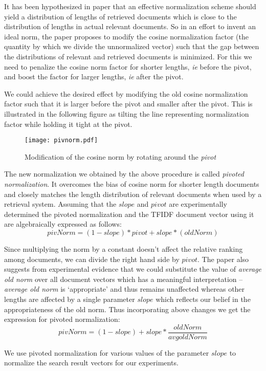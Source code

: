 \documentclass[a4paper,12pt]{report}
\begin{document}
It has been hypothesized in paper \cite{amit} that an effective
normalization scheme should yield a distribution of lengths of
retrieved documents which is close to the distribution of lengths in
actual relevant documents. So in an effort to invent an ideal norm,
the paper proposes to modify the cosine normalization factor (the
quantity by which we divide the unnormalized vector) such that the gap
between the distributions of relevant and retrieved documents
is minimized. For this we need to penalize the cosine norm factor for
shorter lengths, {\it ie} before the pivot, and boost the factor for
larger lengths, {\it ie} after the pivot.


We could achieve the desired effect by modifying the old cosine
normalization factor such that it is larger before the pivot and
smaller after the pivot. This is illustrated in the following figure
as tilting the line representing normalization factor while holding it
tight at the pivot.

\begin{figure}[h]
  \centering
  \texttt{[image: pivnorm.pdf]}
  \caption{Modification of the cosine norm by rotating around the {\it pivot}}
\end{figure}

The new normalization we obtained by the above procedure is called
{\it pivoted normalization}. It overcomes the bias of cosine norm for
shorter length documents and closely matches the length distribution
of relevant documents when used by a retrieval system. Assuming that
the $slope$ and $pivot$ are experimentally determined the pivoted
normalization and the TFIDF document vector using it are algebraically
expressed as follows:
$$
      pivNorm = (1 - slope)*pivot + slope*(oldNorm)
$$

Since multiplying the norm by a constant doesn't affect the relative
ranking among documents, we can divide the right hand side by
$pivot$. The paper also suggests from experimental evidence that we
could substitute the value of {\it average old norm} over all document
vectors which has a meaningful interpretation -- {\it average old
  norm} is `appropriate' and thus remains unaffected whereas other
lengths are affected by a single parameter $slope$ which reflects our
belief in the appropriateness of the old norm. Thus incorporating
above changes we get the expression for pivoted normalization:
$$
     pivNorm = (1 - slope) + slope * \frac{oldNorm}{avgoldNorm}
$$

We use pivoted normalization for various values of the parameter
$slope$ to normalize the search result vectors for our experiments.
\end{document}
